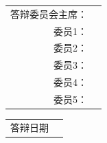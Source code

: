 \vskip 15pt

\begin{center}
    \begin{tabularx}{.7\textwidth}{>{\fangsong}r >{\fangsong}X<{\centering}}
        答辩委员会主席： & \uline{\hfill} \\
        委员1： &  \uline{\hfill} \\
        委员2： &  \uline{\hfill} \\
        委员3： &  \uline{\hfill} \\
        委员4： &  \uline{\hfill} \\
        委员5： &  \uline{\hfill} \\
    \end{tabularx}
\end{center}

\vskip 15pt

\begin{center}
    \begin{tabularx}{.45\textwidth}{>{\fangsong}l >{\fangsong}X<{\centering}}
        答辩日期 & \uline{\hfill}
    \end{tabularx}
\end{center}
